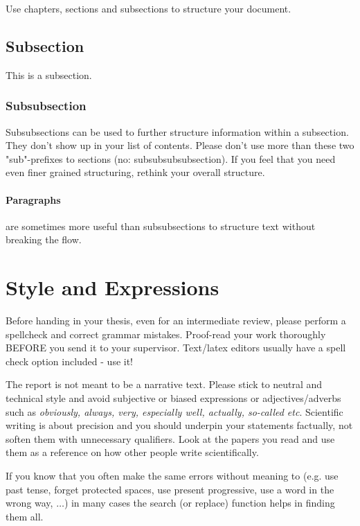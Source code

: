 Use chapters, sections and subsections to structure your document.

\subsection{Subsection}

This is a subsection.

\subsubsection{Subsubsection}

Subsubsections can be used to further structure information within a subsection. They don't show up in your list of contents. Please don't use more than these two "sub"-prefixes to sections (no: subsubsubsubsection). If you feel that you need even finer grained structuring, rethink your overall structure.

\paragraph{Paragraphs} are sometimes more useful than subsubsections to structure text without breaking the flow.


\section{Style and Expressions}

Before handing in your thesis, even for an intermediate review, please perform a spellcheck and correct grammar mistakes. Proof-read your work thoroughly BEFORE you send it to your supervisor. Text/latex editors usually have a spell check option included - use it!

The report is not meant to be a narrative text. Please stick to neutral and technical style and avoid subjective or biased expressions or adjectives/adverbs such as \emph{obviously, always, very, especially well, actually, so-called etc}. Scientific writing is about precision and you should underpin your statements factually, not soften them with unnecessary qualifiers. Look at the papers you read and use them as a reference on how other people write scientifically.

If you know that you often make the same errors without meaning to (e.g. use past tense, forget protected spaces, use present progressive, use a word in the wrong way, $\ldots$) in many cases the search (or replace) function helps in finding them all.

